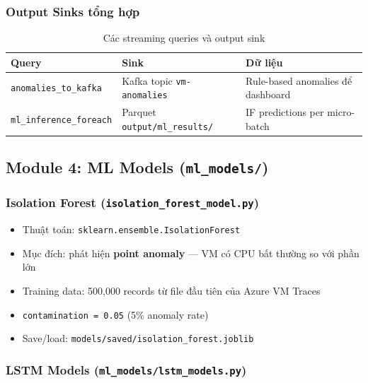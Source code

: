 \documentclass[12pt,a4paper]{article}
\begin{document}
\subsubsection{Output Sinks tổng hợp}

\begin{table}[H]
\centering
\begin{tabularx}{\linewidth}{l l X}
\toprule
\textbf{Query} & \textbf{Sink} & \textbf{Dữ liệu} \\
\midrule
\texttt{anomalies\_to\_kafka} & Kafka topic \texttt{vm-anomalies} & Rule-based anomalies để dashboard \\
\texttt{ml\_inference\_foreach} & Parquet \texttt{output/ml\_results/} & IF predictions per micro-batch \\
\bottomrule
\end{tabularx}
\caption{Các streaming queries và output sink}
\end{table}

\subsection{Module 4: ML Models (\texttt{ml\_models/})}

\subsubsection{Isolation Forest (\texttt{isolation\_forest\_model.py})}
\begin{itemize}
  \item Thuật toán: \texttt{sklearn.ensemble.IsolationForest}
  \item Mục đích: phát hiện \textbf{point anomaly} — VM có CPU bất thường so với phần lớn
  \item Training data: 500,000 records từ file đầu tiên của Azure VM Traces
  \item \texttt{contamination = 0.05} (5\% anomaly rate)
  \item Save/load: \texttt{models/saved/isolation\_forest.joblib}
\end{itemize}

\subsubsection{LSTM Models (\texttt{ml\_models/lstm\_models.py})}
\end{document}
